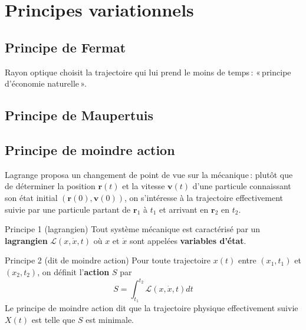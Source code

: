 \section{Principes variationnels}

    \subsection{Principe de Fermat}

    Rayon optique choisit la trajectoire qui lui prend le moins de temps : « principe d’économie naturelle ». 

    \subsection{Principe de Maupertuis}



    \subsection{Principe de moindre action}

    Lagrange proposa un changement de point de vue sur la mécanique : plutôt que de déterminer la position $\mathbf{r}(t)$ et la vitesse $\mathbf{v}(t)$ d’une particule connaissant son état initial $(\mathbf{r}(0), \mathbf{v}(0))$, on s’intéresse à la trajectoire effectivement suivie par une particule partant de $\mathbf{r}_1$ à $t_1$ et arrivant en $\mathbf{r}_2$ en $t_2$. 

    \begin{omed}{Principe 1 (lagrangien)}
        Tout système mécanique est caractérisé par un \textbf{lagrangien} $\mathcal{L}(x, \dot{x}, t)$ où $x$ et $\dot{x}$ sont appelées \textbf{variables d’état}.
    \end{omed}

    \begin{omed}{Principe 2 (dit de moindre action)}
        Pour toute trajectoire $x(t)$ entre $(x_1, t_1)$ et $(x_2, t_2)$, on définit l’\textbf{action} $S$ par 
        \[ S = \int_{t_1}^{t_2} \mathcal{L}(x,\dot{x},t)dt \]  
        Le principe de moindre action dit que la trajectoire physique effectivement suivie $X(t)$ est telle que $S$ est minimale.
    \end{omed}


